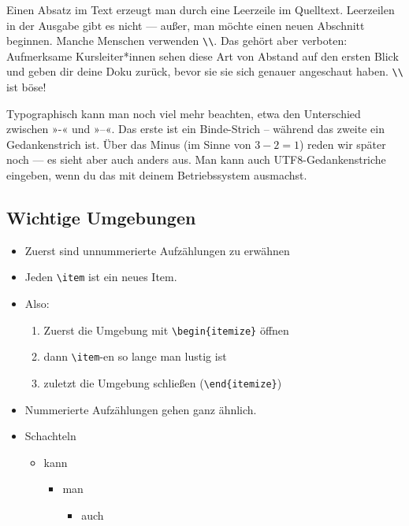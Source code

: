 \documentclass{doku2018}
\begin{document}
Einen Absatz im Text erzeugt man durch eine Leerzeile im Quelltext. Leerzeilen
in der Ausgabe gibt es nicht — außer, man möchte einen neuen Abschnitt beginnen.
Manche Menschen verwenden \verb|\\|. Das gehört aber verboten: Aufmerksame
Kursleiter*innen sehen diese Art von Abstand auf den ersten Blick und geben dir
deine Doku zurück, bevor sie sie sich genauer angeschaut haben. \verb|\\| ist
böse!

Typographisch kann man noch viel mehr beachten, etwa den Unterschied zwischen
»-« und »--«. Das erste ist ein Binde-Strich -- während das zweite ein
Gedankenstrich ist. Über das Minus (im Sinne von $3-2=1$) reden wir später noch
— es sieht aber auch anders aus. Man kann auch UTF8-Gedankenstriche eingeben,
wenn du das mit deinem Betriebssystem ausmachst.

\subsection{Wichtige Umgebungen}

\begin{itemize}
\item Zuerst sind unnummerierte Aufzählungen zu erwähnen
\item Jeden \verb|\item| ist ein neues Item.
\item Also:
  \begin{enumerate}
  \item Zuerst die Umgebung mit \verb|\begin{itemize}| öffnen
    \item dann \verb|\item|-en so lange man lustig ist
    \item zuletzt die Umgebung schließen (\verb|\end{itemize}|)
  \end{enumerate}
\item Nummerierte Aufzählungen gehen ganz ähnlich.
\item Schachteln
  \begin{itemize}
  \item kann
    \begin{itemize}
    \item man
      \begin{itemize}
      \item auch
      \end{itemize}
    \end{itemize}
  \end{itemize}
\end{itemize}
\end{document}
